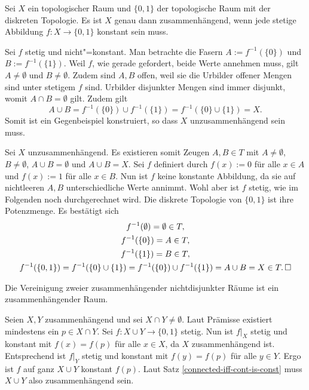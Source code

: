 \begin{Satz}\label{connected-iff-cont-is-const}
Sei $X$ ein topologischer Raum und $\{0,1\}$ der topologische
Raum mit der diskreten Topologie. Es ist $X$ genau dann
zusammenhängend, wenn jede stetige Abbildung $f\colon X\to\{0,1\}$
konstant sein muss.
\end{Satz}
\begin{Beweis}
Sei $f$ stetig und nicht"=konstant. Man betrachte die Fasern
$A:=f^{-1}(\{0\})$ und $B:=f^{-1}(\{1\})$. Weil $f$, wie gerade
gefordert, beide Werte annehmen muss, gilt $A\ne\emptyset$ und
$B\ne\emptyset$. Zudem sind $A,B$ offen, weil sie die Urbilder
offener Mengen sind unter stetigem $f$ sind. Urbilder disjunkter
Mengen sind immer disjunkt, womit $A\cap B=\emptyset$ gilt. Zudem gilt
\[A\cup B = f^{-1}(\{0\})\cup f^{-1}(\{1\}) = f^{-1}(\{0\}\cup \{1\}) = X.\]
Somit ist ein Gegenbeispiel konstruiert, so dass $X$ unzusammenhängend
sein muss.

Sei $X$ unzusammenhängend. Es existieren somit Zeugen $A,B\in T$
mit $A\ne\emptyset$, $B\ne\emptyset$, $A\cup B=\emptyset$ und
$A\cup B = X$. Sei $f$ definiert durch
$f(x):=0$ für alle $x\in A$ und $f(x):=1$ für alle $x\in B$.
Nun ist $f$ keine konstante Abbildung, da sie auf nichtleeren $A,B$
unterschiedliche Werte annimmt. Wohl aber ist $f$ stetig,
wie im Folgenden noch durchgerechnet wird. Die diskrete Topologie
von $\{0,1\}$ ist ihre Potenzmenge. Es bestätigt sich
\begin{gather*}
f^{-1}(\emptyset) = \emptyset\in T,\\
f^{-1}(\{0\}) = A\in T,\\
f^{-1}(\{1\}) = B\in T,\\
f^{-1}(\{0,1\}) = f^{-1}(\{0\}\cup\{1\}) = f^{-1}(\{0\})\cup f^{-1}(\{1\})
= A\cup B = X\in T.\,\square\\
\end{gather*}
\end{Beweis}

\begin{Korollar}
Die Vereinigung zweier zusammenhängender nichtdisjunkter Räume
ist ein zusammenhängender Raum.
\end{Korollar}
\begin{Beweis}
Seien $X,Y$ zusammenhängend und sei $X\cap Y\ne\emptyset$.
Laut Prämisse existiert mindestens ein $p\in X\cap Y$. Sei
$f\colon X\cup Y\to\{0,1\}$ stetig. Nun ist $f|_X$ stetig und
konstant mit $f(x)=f(p)$ für alle $x\in X$, da $X$ zusammenhängend
ist. Entsprechend ist $f|_Y$ stetig und konstant mit $f(y)=f(p)$
für alle $y\in Y$. Ergo ist $f$ auf ganz $X\cup Y$ konstant $f(p)$.
Laut Satz \ref{connected-iff-cont-is-const} muss $X\cup Y$
also zusammenhängend sein.\,\qedsymbol
\end{Beweis}

